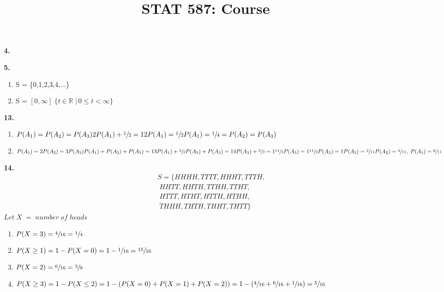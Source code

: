 \documentclass{article}
\title{STAT 587: Course \exerciseset}
\author{\studentname}
\begin{document}
\maketitle

\begin{enumerate}
\item[\textbf{4.}] 
\item[\textbf{5.}]
    \begin{enumerate}
        \item S = \{0,1,2,3,4,...\}
        \item S = \( [0,\infty] \;  \{ t \in \mathbb{R}\; |\,0 \leq t < \infty\}  \)
    \end{enumerate}
\item[\textbf{13.}]
\begin{enumerate}
        \item \(P(A_1)  = P(A_2) = P(A_3)\\ 
                2P(A_1) + \sfrac{1}{2} = 1\\
                2P(A_1) = \sfrac{1}{2}\\
                P(A_1) = \sfrac{1}{4} = P(A_2) = P(A_3)
                \)
        \item \( P(A_1) = 2P(A_2) = 3P(A_3)\\
                P(A_1) + P(A_2) + P(A_3) = 1\\
                3P(A_1) + \sfrac{3}{2}P(A_3) + P(A_3) = 1\\
                4P(A_3) + \sfrac{3}{2} = 1\\
                \sfrac{11}{2}P(A_3) =1\\
                \sfrac{11}{2}P(A_3) = 1\\
                P(A_3) = \sfrac{2}{11}\\
               P(A_2) = \sfrac{3}{11} ,\; P(A_1) = \sfrac{6}{11}\)
    \end{enumerate}
\item[\textbf{14.}] \begin{align*} S = 
                            \{ HHHH, TTTT, HHHT, TTTH,\\
                            \;HHTT, HHTH, TTHH, TTHT,\\
                            \;HTTT, HTHT, HTTH, HTHH,\\
                            \;THHH, THTH, THHT, THTT \} \end{align*}
\(Let\;X\;= \; number \; of \; heads\)
\begin{enumerate}
    \item \(P(X=3) = \sfrac{4}{16} = \sfrac{1}{4} \)
    \item \(P(X\geq 1) = 1-P(X = 0) = 1 - \sfrac{1}{16} = \sfrac{15}{16}\)
    \item \(P(X = 2) = \sfrac{6}{16} = \sfrac{3}{8} \)
    \item \(P(X\geq 3) = 1-P(X\leq2) = 1 - (P(X=0) + P(X=1) + P(X=2)) = 1 - (\sfrac{4}{16} + \sfrac{6}{16} + \sfrac{1}{16}) = \sfrac{5}{16}\)
    
\end{enumerate}                            
\end{enumerate}
\end{document}

